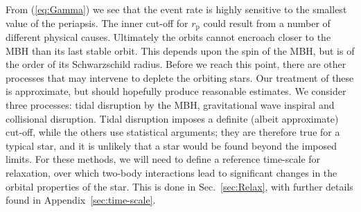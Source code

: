 \documentclass[useAMS,usedcolumn,usegraphicx,usenatbib]{mn2e}
\newcommand{\eqnref}[1]{(\ref{eq:#1})}
\newcommand{\secref}[1]{Sec.~\ref{sec:#1}}
\newcommand{\apref}[1]{Appendix~\ref{sec:#1}}
\newcommand{\sub}[1]{\ensuremath{_\mathrm{#1}}}
\begin{document}
From \eqnref{Gamma} we see that the event rate is highly sensitive to the smallest value of the periapsis. The inner cut-off for $r\sub{p}$ could result from a number of different physical causes. Ultimately the orbits cannot encroach closer to the MBH than its last stable orbit. This depends upon the spin of the MBH, but is of the order of its Schwarzschild radius. Before we reach this point, there are other processes that may intervene to deplete the orbiting stars. Our treatment of these is approximate, but should hopefully produce reasonable estimates. We consider three processes: tidal disruption by the MBH, gravitational wave inspiral and collisional disruption. Tidal disruption imposes a definite (albeit approximate) cut-off, while the others use statistical arguments; they are therefore true for a typical star, and it is unlikely that a star would be found beyond the imposed limits. For these methods, we will need to define a reference time-scale for relaxation, over which two-body interactions lead to significant changes in the orbital properties of the star. This is done in \secref{Relax}, with further details found in \apref{time-scale}.
\end{document}
